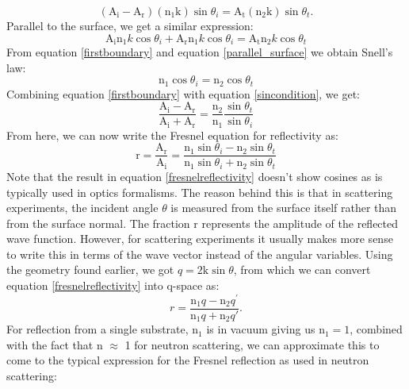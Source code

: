 \begin{equation}\label{sincondition}
	(\textrm{A}_{\textrm{i}} - \textrm{A}_{\textrm{r}})(\textrm{n}_1\textrm{k})\sin{\theta_i} = \textrm{A}_{\textrm{t}}(\textrm{n}_2\textrm{k})\sin{\theta_t}.
\end{equation}
Parallel to the surface, we get a similar expression:
\begin{equation}\label{parallel_surface}
	\textrm{A}_{\textrm{i}} \textrm{n}_1 k \cos\theta_i + 	\textrm{A}_{\textrm{r}} \textrm{n}_1 k \cos\theta_i = 	\textrm{A}_{\textrm{t}} \textrm{n}_2 k \cos\theta_t
\end{equation}
From equation \ref{firstboundary} and equation \ref{parallel_surface} we obtain Snell's law:
\begin{equation}\label{snells_law}
	\textrm{n}_1 \cos\theta_i = \textrm{n}_2 \cos\theta_t
\end{equation}
Combining equation \ref{firstboundary} with equation \ref{sincondition}, we get:
\begin{equation}\label{fresnel_ai_ar}
	\frac{\textrm{A}_{\textrm{i}}-\textrm{A}_{\textrm{r}}}{\textrm{A}_{\textrm{i}}+\textrm{A}_{\textrm{r}}} = \frac{\textrm{n}_2}{\textrm{n}_1} \frac{\sin{\theta_t}}{\sin{\theta_i}}
\end{equation}
From here, we can now write the Fresnel equation for reflectivity as:
\begin{equation}\label{fresnelreflectivity}
	\textrm{r} = \frac{\textrm{A}_{\textrm{r}}}{\textrm{A}_{\textrm{i}}} = \frac{\textrm{n}_1\sin{\theta_i} - \textrm{n}_2 \sin{\theta_t}}{\textrm{n}_1\sin{\theta_i} + \textrm{n}_2 \sin{\theta_t}} 
\end{equation}
Note that the result in equation \ref{fresnelreflectivity} doesn't show cosines as is typically used in optics formalisms. The reason behind this is that in scattering experiments, the incident angle $\theta$ is measured from the surface itself rather than from the surface normal. The fraction r represents the amplitude of the reflected wave function. However, for scattering experiments it usually makes more sense to write this in terms of the wave vector instead of the angular variables. Using the geometry found earlier, we got $q= \textrm{2k} \sin{\theta}$, from which we can convert equation \ref{fresnelreflectivity} into q-space as:
\begin{equation}\label{fresnel_qspace}
	r = \frac{\textrm{n}_1q- \textrm{n}_2q^{\prime}}{\textrm{n}_1q+ \textrm{n}_2q{\prime}}.
\end{equation}
For reflection from a single substrate, $\textrm{n}_1$ is in vacuum giving us $\textrm{n}_1 = 1$, combined with the fact that n $\approx$ 1 for neutron scattering, we can approximate this to come to the typical expression for the Fresnel reflection as used in neutron scattering:
